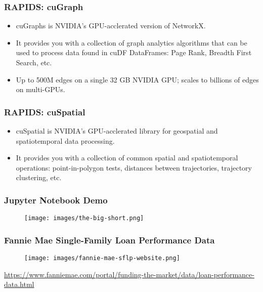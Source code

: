 \documentclass{beamer}
\begin{document}
\begin{frame}
   \frametitle{RAPIDS: cuGraph}
   \begin{itemize}\setlength\itemsep{1.5em}
      \item cuGraphs is NVIDIA's GPU-acclerated version of NetworkX. 
      \item It provides you with a collection of graph analytics 
         algorithms that can be used to process data found in cuDF 
         DataFrames: Page Rank, Breadth First Search, etc.
      \item Up to 500M edges on a single 32 GB NVIDIA GPU; scales to
         billions of edges on multi-GPUs.
   \end{itemize}
\end{frame}

\begin{frame}
   \frametitle{RAPIDS: cuSpatial}
   \begin{itemize}\setlength\itemsep{1.5em}
      \item cuSpatial is NVIDIA's GPU-acclerated library for geospatial
         and spatiotemporal data processing.
      \item It provides you with a collection of common spatial and 
         spatiotemporal operations: point-in-polygon tests, distances 
         between trajectories, trajectory clustering, etc.
   \end{itemize}
\end{frame}

\begin{frame}
   \frametitle{Jupyter Notebook Demo}
   \begin{figure}[htbp]
      \texttt{[image: images/the-big-short.png]}
   \end{figure}
\end{frame}

\begin{frame}
   \frametitle{Fannie Mae Single-Family Loan Performance Data}
   \begin{figure}[htbp]
      \texttt{[image: images/fannie-mae-sflp-website.png]}
   \end{figure}
   \url{https://www.fanniemae.com/portal/funding-the-market/data/loan-performance-data.html}
\end{frame}
\end{document}
